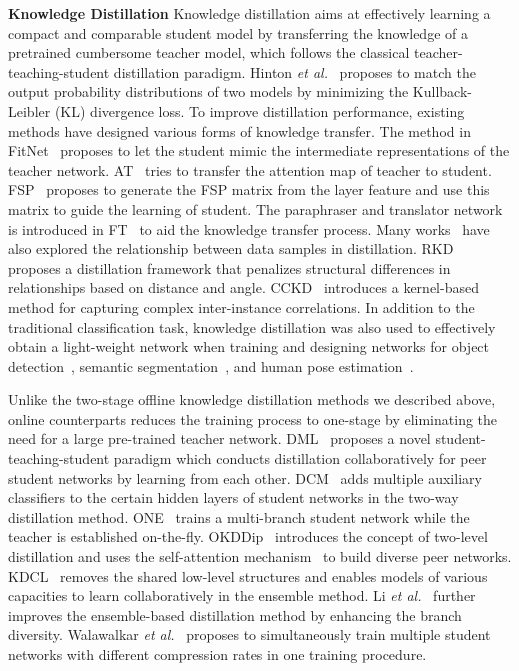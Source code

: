 \documentclass[letterpaper]{article} %
\begin{document}
\textbf{Knowledge Distillation} Knowledge distillation aims at effectively learning a compact and comparable student model by transferring the knowledge of a pretrained cumbersome teacher model, which follows the classical teacher-teaching-student distillation paradigm. Hinton \textit{et al.}~\cite{hinton2015distilling} proposes to match the output probability distributions of two models by minimizing the Kullback-Leibler (KL) divergence loss. To improve distillation performance, existing methods have designed various forms of knowledge transfer. The method in FitNet~\cite{romero2014fitnets} proposes to let the student mimic the intermediate representations of the teacher network. AT~\cite{zagoruyko2016paying} tries to transfer the attention map of teacher to student. FSP~\cite{yim2017gift} proposes to generate the FSP matrix from the layer feature and use this matrix to guide the learning of student. The paraphraser and translator network is introduced in FT~\cite{kim2018paraphrasing} to aid the knowledge transfer process.
Many works~\cite{xu2019data,tung2019similarity,yun2020regularizing} have also explored the relationship between data samples in distillation. RKD~\cite{park2019relational} proposes a distillation framework that penalizes structural differences in relationships based on distance and angle. CCKD~\cite{peng2019correlation} introduces a kernel-based method for capturing complex inter-instance correlations.
In addition to the traditional classification task, knowledge distillation was also used to effectively obtain a light-weight network when training and designing networks for object detection~\cite{li2017mimicking,chen2017learning}, semantic segmentation~\cite{liu2019structured,Ye2019StudentBT}, and human pose estimation~\cite{zhang2019fast,li2021online}.

Unlike the two-stage offline knowledge distillation methods we described above, online counterparts reduces the training process to one-stage by eliminating the need for a large pre-trained teacher network. DML~\cite{zhang2018deep} proposes a novel student-teaching-student paradigm which conducts distillation collaboratively for peer student networks by learning from each other. DCM~\cite{yao2020knowledge} adds multiple auxiliary classifiers to the certain hidden layers of student networks in the two-way distillation method. ONE~\cite{zhu2018knowledge} trains a multi-branch student network while the teacher is established on-the-fly. OKDDip~\cite{chen2020online} introduces the concept of two-level distillation and uses the self-attention mechanism~\cite{vaswani2017attention} to build diverse peer networks. KDCL~\cite{guo2020online} removes the shared low-level structures and enables models of various capacities to learn collaboratively in the ensemble method. Li \textit{et al.}~\cite{li2020online} further improves the ensemble-based distillation method by enhancing the branch diversity. Walawalkar \textit{et al.}~\cite{walawalkar2020online} proposes to simultaneously train multiple student networks with different compression rates in one training procedure. 
\end{document}
